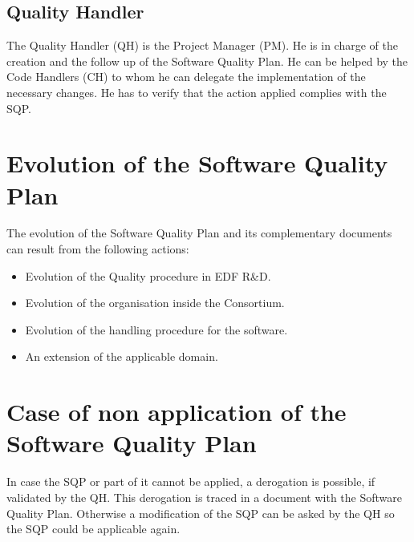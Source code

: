 \subsection{Quality Handler}

The Quality Handler (QH) is the \telemacsystem{} Project Manager (PM). He is in
charge of the creation and the follow up of the Software Quality Plan. He can
be helped by the Code Handlers (CH) to whom he can delegate the implementation
of the necessary changes. He has to verify that the action applied complies
with the SQP\@.

\section{Evolution of the Software Quality Plan}

The evolution of the Software Quality Plan and its complementary documents can
result from the following actions:
\begin{itemize}
\item Evolution of the Quality procedure in EDF R\&D.
\item Evolution of the organisation inside the Consortium.
\item Evolution of the handling procedure for the software.
\item An extension of the applicable domain.
\end{itemize}

\section{Case of non application of the Software Quality Plan}

In case the SQP or part of it cannot be applied, a derogation is possible, if
validated by the QH\@. This derogation is traced in a document with the Software
Quality Plan. Otherwise a modification of the SQP can be asked by the QH so
the SQP could be applicable again.
